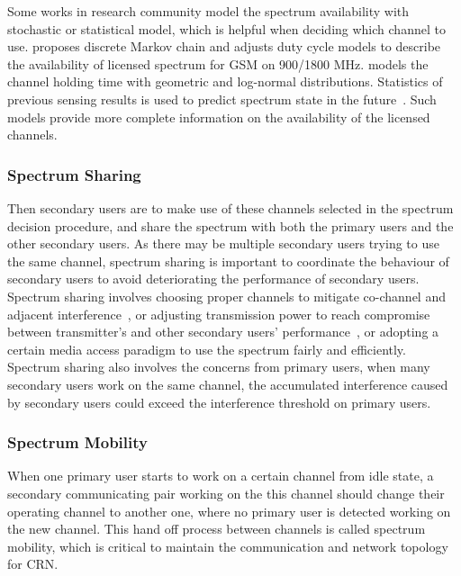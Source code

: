 Some works in research community model the spectrum availability with stochastic or statistical model, which is helpful when deciding which channel to use.
\cite{Discrete-Time_Spectrum_Occupancy_Model_DySPAN_2011} proposes discrete Markov chain and adjusts duty cycle models to describe the availability of licensed spectrum for GSM on 900/1800 MHz.
\cite{Wellens200910} models the channel holding time with geometric and log-normal distributions.
Statistics of previous sensing results is used to predict spectrum state in the future~\cite{spectrum-discovery-tmc08}.
Such models provide more complete information on the availability of the licensed channels.




\subsubsection{Spectrum Sharing}
Then secondary users are to make use of these channels selected in the spectrum decision procedure, and share the spectrum with both the primary users and the other secondary users.
As there may be multiple secondary users trying to use the same channel, spectrum sharing is important to coordinate the behaviour of secondary users to avoid deteriorating the performance of secondary users.
Spectrum sharing involves choosing proper channels to mitigate co-channel and adjacent interference~\cite{ca_crn_survey_2013}, or adjusting transmission power to reach compromise between transmitter's and other secondary users' performance~\cite{pa_crn_survey_2012}, or adopting a certain media access paradigm to use the spectrum fairly and efficiently.
Spectrum sharing also involves the concerns from primary users, \ie when many secondary users work on the same channel, the accumulated interference caused by secondary users could exceed the interference threshold on primary users.


\subsubsection{Spectrum Mobility}
When one primary user starts to work on a certain channel from idle state, a secondary communicating pair working on the this channel should change their operating channel to another one, where no primary user is detected working on the new channel.
This hand off process between channels is called spectrum mobility, which is critical to maintain the communication and network topology for CRN.  





